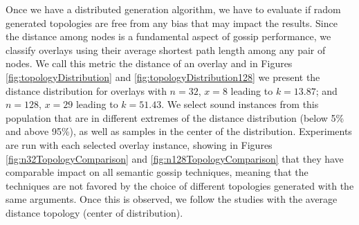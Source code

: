 Once we have a distributed generation algorithm, we have to evaluate if radom generated topologies are free from any bias that may impact the results.
Since the distance among nodes is a fundamental aspect of gossip performance,  we classify overlays using their average shortest path length among any pair of nodes.  We call this metric the distance of an overlay and in Figures \ref{fig:topologyDistribution} and
\ref{fig:topologyDistribution128}
we present the distance distribution for overlays with $n=32$, $x=8$ leading to $k=13.87$; and $n=128$, $x=29$ leading to $k =51.43$.
We select sound instances from this population that are in different extremes of the distance distribution (below 5\% and above 95\%), as well as samples in the center of the distribution.  Experiments are run with each selected overlay instance, showing in Figures \ref{fig:n32TopologyComparison} and  \ref{fig:n128TopologyComparison} that they have comparable impact on all semantic gossip techniques, meaning that the techniques are not favored by the choice of different   topologies generated with the same arguments.  %
%
Once this is observed, we follow the studies with the average distance topology (center of distribution).




